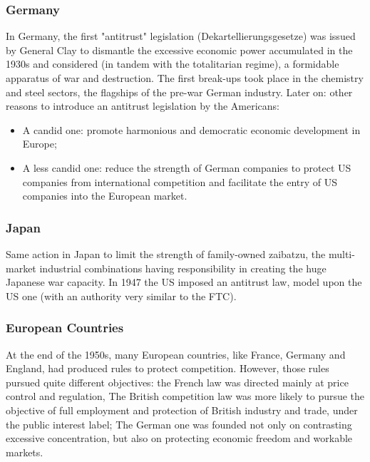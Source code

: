         \subsubsection{Germany}

            In Germany, the first "antitrust" legislation (Dekartellierungsgesetze) was issued by General Clay to dismantle the excessive economic power accumulated in the 1930s and considered (in tandem with the totalitarian regime), a formidable apparatus of war and destruction. The first break-ups took place in the chemistry and steel sectors, the flagships of the pre-war German industry. 
            Later on: other reasons to introduce an antitrust legislation by the Americans:  
            \begin{itemize}
                \item A candid one: promote harmonious and democratic economic development in Europe;
                \item A less candid one: reduce the strength of German companies to protect US companies from international competition and facilitate the entry of US companies into the European market.
            \end{itemize}

        \subsubsection{Japan}

            Same action in Japan to limit the strength of family-owned zaibatzu, the multi-market industrial combinations having responsibility in creating the huge Japanese war capacity. In 1947 the US imposed an antitrust law, model upon the US one (with an authority very similar to the FTC).

        \subsubsection{European Countries}

            At the end of the 1950s, many European countries, like France, Germany and England, had produced rules to protect competition. 
            However, those rules pursued quite different objectives: the French law was directed mainly at price control and regulation, 
            The British competition law was more likely to pursue the objective of full employment and protection of British industry and trade, under the public interest label; 
            The German one was founded not only on contrasting excessive concentration, but also on protecting economic freedom and workable markets.

